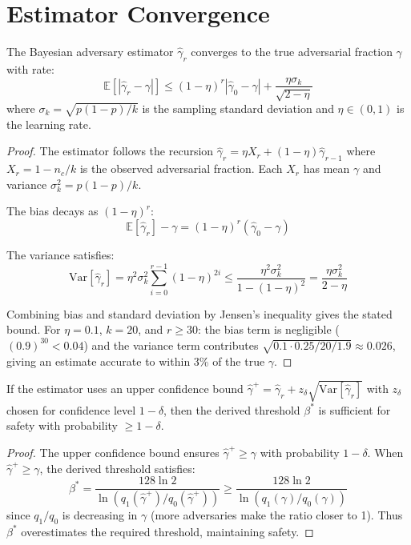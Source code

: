 \section{Estimator Convergence}

\label{sec:ray-estimator}

\begin{theorem}
\label{thm:ray-estimator}
The Bayesian adversary estimator $\hat{\gamma}_r$ converges to the true adversarial
fraction $\gamma$ with rate:
\[
\mathbb{E}[|\hat{\gamma}_r - \gamma|] \leq (1 - \eta)^r |\hat{\gamma}_0 - \gamma| + \frac{\eta \sigma_k}{\sqrt{2 - \eta}}
\]
where $\sigma_k = \sqrt{p(1-p)/k}$ is the sampling standard deviation and $\eta \in (0, 1)$
is the learning rate.
\end{theorem}

\begin{proof}
The estimator follows the recursion $\hat{\gamma}_r = \eta X_r + (1 - \eta)\hat{\gamma}_{r-1}$
where $X_r = 1 - n_c/k$ is the observed adversarial fraction. Each $X_r$ has mean $\gamma$
and variance $\sigma_k^2 = p(1-p)/k$.

The bias decays as $(1-\eta)^r$:
\[
\mathbb{E}[\hat{\gamma}_r] - \gamma = (1-\eta)^r(\hat{\gamma}_0 - \gamma)
\]

The variance satisfies:
\[
\text{Var}[\hat{\gamma}_r] = \eta^2 \sigma_k^2 \sum_{i=0}^{r-1} (1-\eta)^{2i}
\leq \frac{\eta^2 \sigma_k^2}{1 - (1-\eta)^2} = \frac{\eta \sigma_k^2}{2 - \eta}
\]

Combining bias and standard deviation by Jensen's inequality gives the stated bound.
For $\eta = 0.1$, $k = 20$, and $r \geq 30$: the bias term is negligible
($(0.9)^{30} < 0.04$) and the variance term contributes $\sqrt{0.1 \cdot 0.25/20 / 1.9} \approx 0.026$,
giving an estimate accurate to within 3\% of the true $\gamma$.
\end{proof}

\begin{lemma}
\label{lem:ray-conservative}
If the estimator uses an upper confidence bound $\hat{\gamma}^+ = \hat{\gamma}_r + z_{\delta} \sqrt{\text{Var}[\hat{\gamma}_r]}$
with $z_\delta$ chosen for confidence level $1 - \delta$, then the derived threshold
$\beta^*$ is sufficient for safety with probability $\geq 1 - \delta$.
\end{lemma}

\begin{proof}
The upper confidence bound ensures $\hat{\gamma}^+ \geq \gamma$ with probability $1 - \delta$.
When $\hat{\gamma}^+ \geq \gamma$, the derived threshold satisfies:
\[
\beta^* = \frac{128 \ln 2}{\ln(q_1(\hat{\gamma}^+) / q_0(\hat{\gamma}^+))} \geq \frac{128 \ln 2}{\ln(q_1(\gamma) / q_0(\gamma))}
\]
since $q_1/q_0$ is decreasing in $\gamma$ (more adversaries make the ratio closer to 1).
Thus $\beta^*$ overestimates the required threshold, maintaining safety.
\end{proof}

